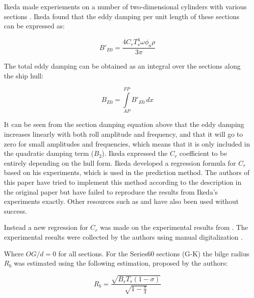     Ikeda made experiements on a number of two-dimensional cylinders with
various sections \cite{7505983/4AFVVGNT}. Ikeda found that the eddy
damping per unit length of these sections can be expressed as:
 
            
    
    \begin{equation}
B'_{E0} = \frac{4 C_{r} T_{s}^{4} \omega \phi_{a} \rho}{3 \pi}
\label{eq:equation}
\end{equation}

    

    The total eddy damping can be obtained as an integral over the sections
along the ship hull:
 
            
    
    \begin{equation}
B_{E0} = \int\limits_{AP}^{FP} B'_{E0}\, dx
\label{eq:equation}
\end{equation}

    

    It can be seen from the section damping equation above that the eddy
damping increases linearly with both roll amplitude and frequency, and
that it will go to zero for small amplitudes and frequencies, which
means that it is only included in the quadratic damping term (\(B_2\)).
Ikeda expressed the \(C_r\) coefficient to be entirely depending on the
hull form. Ikeda developed a regression formula for \(C_r\) based on his
experiments, which is used in the prediction method. The authors of this
paper have tried to implement this method according to the description
in the original paper \cite{7505983/4AFVVGNT} but have failed to
reproduce the results from Ikeda's experiments exactly. Other resources
such as \cite{7505983/FB64RGPF} and \cite{7505983/KAKIM2E2} have also
been used without success.

Instead a new regression for \(C_r\) was made on the experimental
results from \cite{7505983/4AFVVGNT}. The experimental results were
collected by the authors using manual digitalization
\cite{7505983/RXYIE6UW}.

    Where \(OG/d=0\) for all sections. For the Series60 sections (G-K) the
bilge radius \(R_b\) was estimated using the following estimation,
proposed by the authors:
 
            
    
    \begin{equation}
R_{b} = \frac{\sqrt{B_{s} T_{s} \left(1 - \sigma\right)}}{\sqrt{1 - \frac{\pi}{4}}}
\label{eq:equation}
\end{equation}


